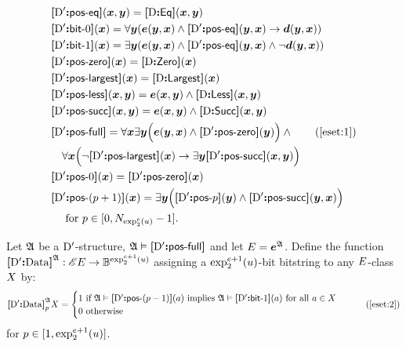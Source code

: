 \begin{align}
  &\fposeq\DSp(\xx,\yy) = \fEq\DS(\xx,\yy) \nonumber \\
  &\fbitO\DSp(\xx) = \forall\yy(\se(\yy,\xx) \land 
    \fposeq\DSp(\yy,\xx) \limp \sd(\yy, \xx)) \nonumber \\
  &\fbitI\DSp(\xx) = \exists\yy(\se(\yy,\xx) \land
    \fposeq\DSp(\yy,\xx) \land \lnot\sd(\yy,\xx)) \nonumber \\
  &\fposzero\DSp(\xx) = \fZero\DS(\xx) \nonumber \\
  &\fposmax\DSp(\xx) = \fLargest\DS(\xx) \nonumber \\
  &\fposless\DSp(\xx,\yy) = \se(\xx,\yy) \land
    \fLess\DS(\xx,\yy) \nonumber \\
  &\fpossucc\DSp(\xx,\yy) = \se(\xx,\yy) \land
    \fSucc\DS(\xx,\yy) \nonumber \\
  &\fposfull\DSp = \forall\xx\exists\yy\Big(\se(\yy,\xx) \land 
    \fposzero\DSp(\yy)\Big) \land \tag{\ref{eset:1}}\\
    &\quad\forall\xx\Big(\lnot\fposmax\DSp(\xx) \limp
    \exists\yy\fpossucc\DSp(\xx,\yy)\Big) \nonumber \\
  &\fposA\DSp0(\xx) = \fposzero\DSp(\xx) \nonumber \\
  &\fposA\DSp{(\posp+1)}(\xx) = \exists\yy\Big(
    \fposA\DSp\posp(\yy) \land \fpossucc\DSp(\yy,\xx)
  \Big) \nonumber \\
    &\quad\text{ for } \posp \in [0,\largtbit{\tetr\sze2\szu}-1].\nonumber
\end{align}

Let $\StrA$ be a $\DSp$-structure, $\StrA \vDash \fposfull\DSp$ and let
$\relE=\at\StrA\se$.
Define the function $\Data\DSp\StrA : \Ecl\relE \to
\tBitstrings{\tetr{\sze+1}2\szu}$ assigning a $\tetr{\sze+1}2\szu$-bit
bitstring to any $\relE$-class $\eclX$ by:
\begin{equation}
  \Data\DSp\StrA_\posp\eclX = \begin{cases}
  1 \text{ if } \StrA \vDash \fposA\DSp{(\posp-1)}(\ea) 
  \text{ implies } \StrA \vDash \fbitI\DSp(\ea)
  \text{ for all } \ea \in \eclX
  \\
  0 \text{ otherwise}
  \end{cases}\tag{\ref{eset:2}}
\end{equation}
for $\posp \in [1,\tetr{\sze+1}2\szu]$.

